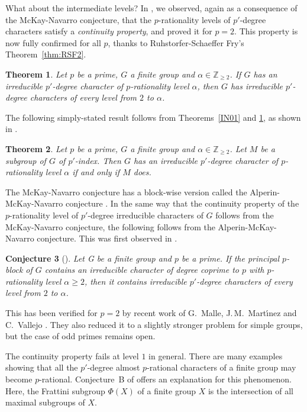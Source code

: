 \documentclass[12pt]{amsart}
\newtheorem{theorem}{Theorem}[section]
\newtheorem{conjecture}[theorem]{Conjecture}
\theoremstyle{definition}
\numberwithin{equation}{section}
\newcommand{\ZZ}{{\mathbb Z}}
\begin{document}
What about the intermediate levels? In \cite{Hung22}, we observed,
again as a consequence of the McKay-Navarro conjecture, that the
$p$-rationality levels of $p'$-degree characters satisfy a
\emph{continuity property}, and proved it for $p=2$. This property
is now fully confirmed for all $p$, thanks to Ruhstorfer-Schaeffer
Fry's Theorem~\ref{thm:RSF2}.

\begin{theorem}\label{thm:continuity}
Let $p$ be a prime, $G$ a finite group and $\alpha\in \ZZ_{\geq 2}$.
If $G$ has an irreducible $p'$-degree character of $p$-rationality
level $\alpha$, then $G$ has irreducible $p'$-degree characters of
every level from $2$ to $\alpha$.
\end{theorem}

The following simply-stated result follows from Theorems~\ref{IN01}
and \ref{thm:continuity}, as shown in \cite[Theorem~2.5]{Hung22}.


\begin{theorem}
Let $p$ be a prime, $G$ a finite group and $\alpha\in \ZZ_{\geq 2}$.
Let $M$ be a subgroup of $G$ of $p'$-index. Then $G$ has an
irreducible $p'$-degree character of $p$-rationality level $\alpha$
if and only if $M$ does.
\end{theorem}

The McKay-Navarro conjecture has a block-wise version called the
Alperin-McKay-Navarro conjecture \cite{Navarro04}. In the same way
that the continuity property of the $p$-rationality level of
$p'$-degree irreducible characters of $G$ follows from the
McKay-Navarro conjecture, the following follows from the
Alperin-McKay-Navarro conjecture. This was first observed in
\cite{Hung22}.

\begin{conjecture}[\cite{Hung22}]
Let G be a finite group and $p$ be a prime. If the principal
$p$-block of $G$ contains an irreducible character of degree coprime
to $p$ with $p$-rationality level $\alpha\geq 2$, then it contains
irreducible $p'$-degree characters of every level from $2$ to
$\alpha$.
\end{conjecture}

This has been verified for $p=2$ by recent work of G.~Malle,
J.\,M.~Mart\'{\i}nez and C.~Vallejo \cite{MMV24}. They also reduced
it to a slightly stronger problem for simple groups, but the case of
odd primes remains open.

The continuity property fails at level $1$ in general. There are
many examples showing that all the $p'$-degree almost $p$-rational
characters of a finite group may become $p$-rational. Conjecture~B
of \cite{MMV24} offers an explanation for this phenomenon. Here, the
Frattini subgroup $\Phi(X)$ of a finite group $X$ is the
intersection of all maximal subgroups of $X$.
\end{document}
